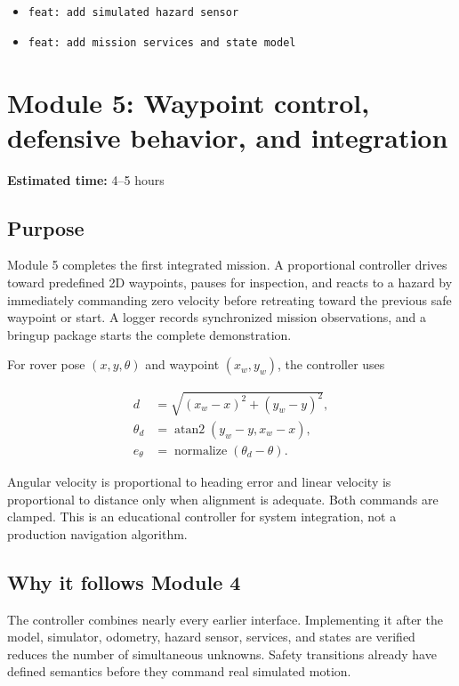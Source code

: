 \documentclass[11pt]{article}
\begin{document}
\begin{itemize}
  \item \texttt{feat: add simulated hazard sensor}
  \item \texttt{feat: add mission services and state model}
\end{itemize}

\section{Module 5: Waypoint control, defensive behavior, and integration}

\textbf{Estimated time:} 4--5 hours

\subsection{Purpose}

Module 5 completes the first integrated mission. A proportional controller
drives toward predefined 2D waypoints, pauses for inspection, and reacts to a
hazard by immediately commanding zero velocity before retreating toward the
previous safe waypoint or start. A logger records synchronized mission
observations, and a bringup package starts the complete demonstration.

For rover pose $(x,y,\theta)$ and waypoint $(x_{w},y_{w})$, the controller uses

\begin{align}
d &= \sqrt{(x_{w}-x)^{2} + (y_{w}-y)^{2}}, \\
\theta_{d} &= \operatorname{atan2}(y_{w}-y, x_{w}-x), \\
e_{\theta} &= \operatorname{normalize}(\theta_{d}-\theta).
\end{align}

Angular velocity is proportional to heading error and linear velocity is
proportional to distance only when alignment is adequate. Both commands are
clamped. This is an educational controller for system integration, not a
production navigation algorithm.

\subsection{Why it follows Module 4}

The controller combines nearly every earlier interface. Implementing it after
the model, simulator, odometry, hazard sensor, services, and states are verified
reduces the number of simultaneous unknowns. Safety transitions already have
defined semantics before they command real simulated motion.
\end{document}

